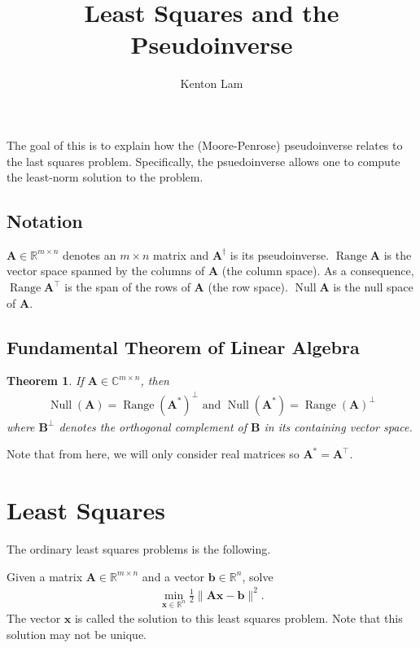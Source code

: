 \documentclass[12pt,a4paper]{article} %
\title{Least Squares and the Pseudoinverse}
\author{Kenton Lam}
\newtheorem*{theorem}{Theorem}
\DeclareMathOperator{\Range}{Range}
\DeclareMathOperator{\Null}{Null}
\begin{document}
\maketitle

The goal of this is to explain how the (Moore-Penrose) pseudoinverse relates 
to the last squares problem. Specifically, the psuedoinverse allows one to 
compute the least-norm solution to the problem.

\subsection*{Notation}
$\mathbf A \in \mathbb R^{m \times n}$ denotes an $m \times n$ matrix 
and $\mathbf A^\dagger$ is its pseudoinverse. $\Range \mathbf A$ is the vector space 
spanned by the columns of $\mathbf A$ (the column space). As a consequence, $\Range \mathbf A^\top$ is 
the span of the rows of $\mathbf A$ (the row space). $\Null \mathbf A$ is the null space of $\mathbf A$.

\subsection*{Fundamental Theorem of Linear Algebra}
\begin{theorem}
    If $\mathbf A \in \mathbb C^{m \times n}$, then 
    \begin{align*}
        \Null (\mathbf A) = \Range (\mathbf A^*)^\perp \text{ and }
        \Null (\mathbf A^*) = \Range(\mathbf A)^\perp
    \end{align*}
    where $\mathbf B^\perp$ denotes the orthogonal complement of $\mathbf B$ in its 
    containing vector space.
\end{theorem}
Note that from here, we will only consider real matrices so $\mathbf A^* = \mathbf A^\top$.

\section{Least Squares}
The ordinary least squares problems is the following.

Given a matrix $\mathbf A \in \mathbb R^{m \times n}$ 
and a vector $\bm b \in \mathbb R^{n}$, solve
\begin{align*}
    \min_{\bm x \in \mathbb R^n} \frac{1}{2} \| \mathbf A \bm x - \bm b \| ^2.
\end{align*}
The vector $\bm x$ is called the solution to this least squares problem. Note that this 
solution may not be unique.
\end{document}
